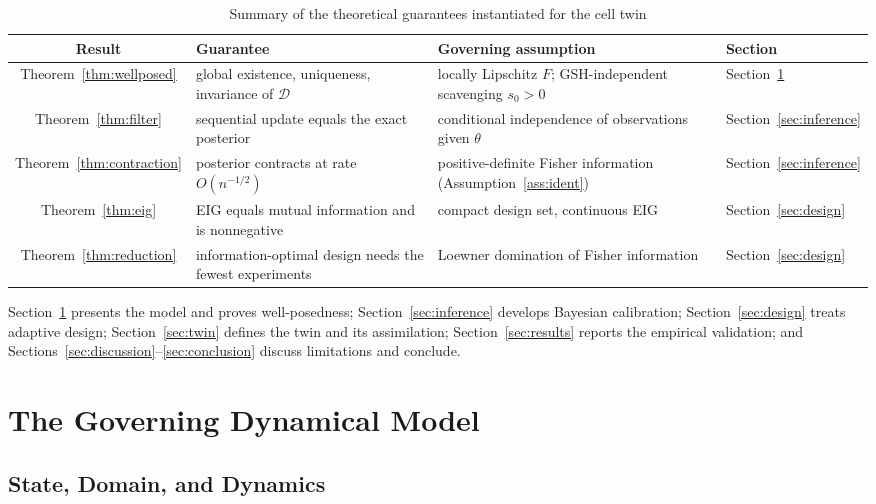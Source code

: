 \documentclass[journal]{IEEEtran}
\begin{document}
\begin{table}[!t]
\renewcommand{\arraystretch}{1.25}
\caption{Summary of the theoretical guarantees instantiated for the cell twin}
\label{tab:theory}
\centering
\begin{tabular}{@{}clll@{}}
\toprule
Result & Guarantee & Governing assumption & Section \\
\midrule
Theorem~\ref{thm:wellposed} & global existence, uniqueness, invariance of $\mathcal{D}$ & locally Lipschitz $F$; GSH-independent scavenging $s_0>0$ & Section~\ref{sec:model} \\
Theorem~\ref{thm:filter} & sequential update equals the exact posterior & conditional independence of observations given $\theta$ & Section~\ref{sec:inference} \\
Theorem~\ref{thm:contraction} & posterior contracts at rate $O(n^{-1/2})$ & positive-definite Fisher information (Assumption~\ref{ass:ident}) & Section~\ref{sec:inference} \\
Theorem~\ref{thm:eig} & EIG equals mutual information and is nonnegative & compact design set, continuous EIG & Section~\ref{sec:design} \\
Theorem~\ref{thm:reduction} & information-optimal design needs the fewest experiments & Loewner domination of Fisher information & Section~\ref{sec:design} \\
\bottomrule
\end{tabular}
\end{table}

Section~\ref{sec:model} presents the model and proves well-posedness;
Section~\ref{sec:inference} develops Bayesian calibration; Section~\ref{sec:design}
treats adaptive design; Section~\ref{sec:twin} defines the twin and its
assimilation; Section~\ref{sec:results} reports the empirical validation; and
Sections~\ref{sec:discussion}--\ref{sec:conclusion} discuss limitations and
conclude.

\section{The Governing Dynamical Model}
\label{sec:model}

\subsection{State, Domain, and Dynamics}
\end{document}
